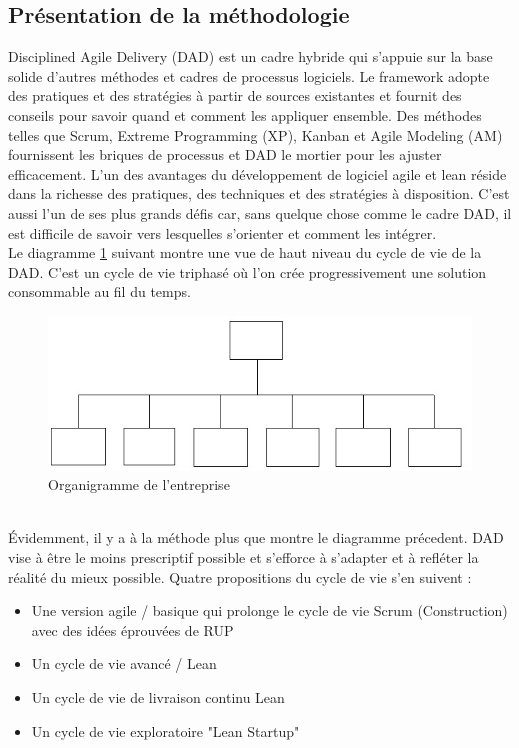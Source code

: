 \begin{spacing}{1.5}
\subsection{Présentation de la méthodologie}
Disciplined Agile Delivery (DAD) est un cadre hybride qui s'appuie sur la base solide d'autres méthodes et cadres de processus logiciels. Le framework adopte des pratiques et des stratégies à partir de sources existantes et fournit des conseils pour savoir quand et comment les appliquer ensemble. Des méthodes telles que Scrum, Extreme Programming (XP), Kanban et Agile Modeling (AM) fournissent les briques de processus et DAD le mortier pour les ajuster efficacement. L'un des avantages du développement de logiciel agile et lean réside dans la richesse des pratiques, des techniques et des stratégies à disposition. C'est aussi l'un de ses plus grands défis car, sans quelque chose comme le cadre DAD, il est difficile de savoir vers lesquelles s'orienter et comment les intégrer.\\
Le diagramme \ref{fig:triphase} suivant montre une vue de haut niveau du cycle de vie de la DAD. C'est un cycle de vie triphasé où l'on crée progressivement une solution consommable au fil du temps.\\

\begin{figure}[h]
\centering
\includegraphics[width=0.8\linewidth]{organigramme.jpg}
\caption{Organigramme de l'entreprise}
\label{fig:triphase}
\end{figure}
\\
Évidemment, il y a à la méthode plus que montre le diagramme précedent. DAD vise à être le moins prescriptif possible et s'efforce à s'adapter et à refléter la réalité du mieux possible. Quatre propositions du cycle de vie s'en suivent :
\begin{itemize}
    \item Une version agile / basique qui prolonge le cycle de vie Scrum (Construction) avec des idées éprouvées de RUP
    \item Un cycle de vie avancé / Lean
    \item Un cycle de vie de livraison continu Lean
    \item Un cycle de vie exploratoire "Lean Startup"
\end{itemize}\\


\end{spacing}

